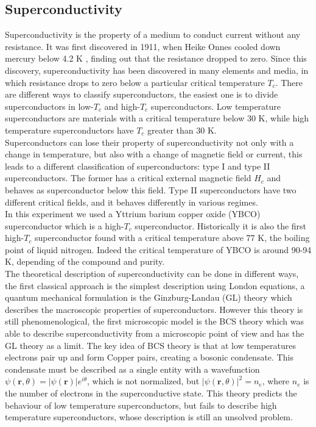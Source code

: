 \documentclass[a4paper,10pt]{article}
\begin{document}
\subsection{Superconductivity}
Superconductivity is the property of a medium to conduct current without any resistance. It was first discovered in 1911, when Heike Onnes cooled down mercury below 4.2 K \cite{firstsuperconductor}, finding out that the resistance dropped to zero. Since this discovery, superconductivity has been discovered in many elements and media, in which resistance drops to zero below a particular critical temperature $T_c$. There are different ways to classify superconductors, the easiest one is to divide superconductors in low-$T_c$ and high-$T_c$ superconductors. Low temperature superconductors are materials with a critical temperature below $30$ K, while high temperature superconductors have $T_c$ greater than 30 K.\\
Superconductors can lose their property of superconductivity not only with a change in temperature, but also with a change of magnetic field or current, this leads to a different classification of superconductors: type I and type II superconductors. The former has a critical external magnetic field $H_c$ and behaves as superconductor below this field. Type II superconductors have two different critical fields, and it behaves differently in various regimes.\\
In this experiment we used a Yttrium barium copper oxide (YBCO) superconductor which is a high-$T_c$ superconductor. Historically it is also the first high-$T_c$ superconductor found with a critical temperature above 77 K, the boiling point of liquid nitrogen. Indeed the critical temperature of YBCO is around 90-94 K, depending of the compound and purity.\\
The theoretical description of superconductivity can be done in different ways, the first classical approach is the simplest description using London equations, a quantum mechanical formulation is the Ginzburg-Landau (GL) theory which describes the macroscopic properties of superconductors. However this theory is still phenomenological, the first microscopic model is the BCS theory which was able to describe superconductivity from a microscopic point of view and has the GL theory as a limit. The key idea of BCS theory is that at low temperatures electrons pair up and form Copper pairs, creating a bosonic condensate. This condensate must be described as a single entity with a wavefunction $\psi(\mathbf{r},\theta) = |\psi(\mathbf{r})| e^{i\theta}$, which is not normalized, but $|\psi(\mathbf{r},\theta)|^2 = n_e$, where $n_e$ is the number of electrons in the superconductive state. This theory predicts the behaviour of low temperature superconductors, but fails to describe high temperature superconductors, whose description is still an unsolved problem.\\
\end{document}
